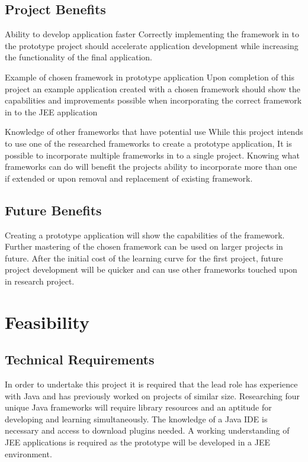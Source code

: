 \subsection{Project Benefits}
Ability to develop application faster\newline
Correctly implementing the framework in to the prototype project should accelerate application development while increasing the functionality of the final application.

Example of chosen framework in prototype application\newline
Upon completion of this project an example application created with a chosen framework should show the capabilities and improvements possible when incorporating the correct framework in to the JEE application

Knowledge of other frameworks that have potential use\newline
While this project intends to use one of the researched frameworks to create a prototype application, It is possible to incorporate multiple frameworks in to a single project. Knowing what frameworks can do will benefit the projects ability to incorporate more than one if extended or upon removal and replacement of existing framework.

\subsection{Future Benefits}
Creating a prototype application will show the capabilities of the framework. Further mastering of the chosen framework can be used on larger projects in future. After the initial cost of the learning curve for the first project, future project development will be quicker and can use other frameworks touched upon in research project.

\section{Feasibility}
\subsection{Technical Requirements}
In order to undertake this project it is required that the lead role has experience with Java and has previously worked on projects of similar size. Researching four unique Java frameworks will require library resources and an aptitude for developing and learning simultaneously. The knowledge of a Java IDE is necessary and access to download plugins needed. A working understanding of JEE applications is required as the prototype will be developed in a JEE environment.  

